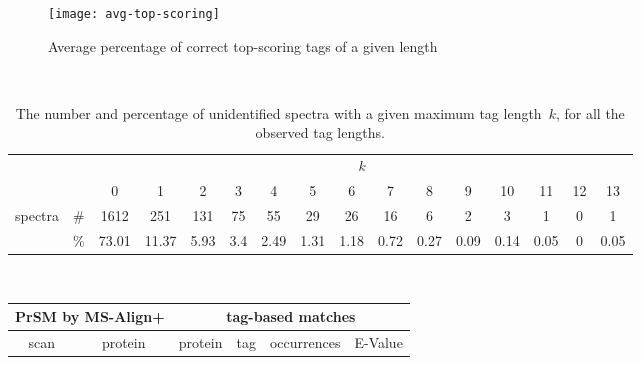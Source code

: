 \documentclass{article}[12pt]
\begin{document}
\begin{figure}
  \begin{center}
\texttt{[image: avg-top-scoring]}
\end{center}
\caption{Average percentage of correct top-scoring tags  of a given length}
  \label{fig:avg-top-scoring}
\end{figure}





\begin{landscape}

\begin{table}[h]
\vspace{3mm}\
{\centering
\begin{center}
\begin{tabular}{|c|c|
c|c|c|c|c|c|c|c|c|c|c|c|c|c|}
  \hline
  \multicolumn{2}{|c|}{} & \multicolumn{ 14}{|c|}{$k$} \\
  \cline{3-16}
  \multicolumn{2}{|c|}{} 
 & 0 & 1 & 2 & 3 & 4 & 5 & 6 & 7 & 8 & 9 & 10 & 11 & 12 & 13\\
  \hline
  \multirow{2}{*}{spectra} & \#
 & 1612 & 251 & 131 & 75 & 55 & 29 & 26 & 16 & 6 & 2 & 3 & 1 & 0 & 1\\
   & \%
 & 73.01 & 11.37 & 5.93 & 3.4 & 2.49 & 1.31 & 1.18 & 0.72 & 0.27 & 0.09 & 0.14 & 0.05 & 0 & 0.05\\
  \hline
\end{tabular}
\end{center}
\par}
\centering
\caption{The number and percentage of unidentified spectra with a given maximum tag length~$k$, for all the observed tag lengths.}
\vspace{3mm}
\label{table:unident-tags}
\end{table}


\begin{table}[h]\footnotesize
\vspace{3mm}\
{\centering
\begin{center}
\begin{tabular}{|c|c||c|c|c|c|}
  \hline
  \multicolumn{2}{|c||}{PrSM by MS-Align+} & \multicolumn{4}{|c|}{tag-based matches} \\
  \hline
  scan & protein & protein & tag & occurrences & E-Value\\


\end{tabular}
\end{center}}
\end{table}
\end{landscape}
\end{document}
